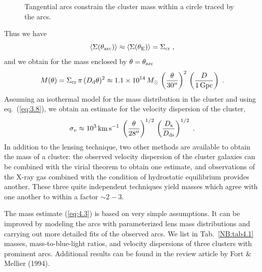 \documentclass[a4paper,10pt]{article} %
\begin{document}
\begin{figure}[ht] %
\begin{center}
\begin{minipage}[t]{0.6\hsize}
\end{minipage}
\end{center}
\caption{Tangential arcs constrain the cluster mass within a circle
  traced by the arcs.}
\label{NB:fig4.2}
\end{figure}

Thus we have
\begin{equation}
  \langle\Sigma(\theta_{\rm arc})\rangle \approx
  \langle\Sigma(\theta_{\rm E})\rangle =
\Sigma_{\rm cr}\;,
\label{eq:4.2}
\end{equation}
and we obtain for the mass enclosed by $\theta=\theta_{\rm arc}$
\begin{equation}
  M(\theta) = \Sigma_{\rm cr}\,\pi\,(D_{\rm d}\theta)^2 \approx
  1.1\times10^{14}\,M_\odot\,\left(\frac{\theta}{30''}\right)^2\,
  \left(\frac{D}{1\,{\rm Gpc}}\right)\;.
\label{eq:4.3}
\end{equation}
Assuming an isothermal model for the mass distribution in the cluster
and using eq.\ (\ref{eq:3.8}), we obtain an estimate for the velocity
dispersion of the cluster,
\begin{equation}
  \sigma_v \approx 10^3\,{\rm km\,s}^{-1}\;
  \left(\frac{\theta}{28''}\right)^{1/2}\,
  \left(\frac{D_{\rm s}}{D_{\rm ds}}\right)^{1/2}\;.
\label{eq:4.4}
\end{equation}
In addition to the lensing technique, two other methods are available
to obtain the mass of a cluster: the observed velocity dispersion of
the cluster galaxies can be combined with the virial theorem to obtain
one estimate, and observations of the X-ray gas combined with the
condition of hydrostatic equilibrium provides another. These three
quite independent techniques yield masses which agree with one another
to within a factor $\sim2-3$.

The mass estimate (\ref{eq:4.3}) is based on very simple assumptions.
It can be improved by modeling the arcs with parameterized lens mass
distributions and carrying out more detailed fits of the observed
arcs. We list in Tab.\ \ref{NB:tab4.1} masses, mass-to-blue-light
ratios, and velocity dispersions of three clusters with prominent
arcs. Additional results can be found in the review article by Fort \&
Mellier (1994).
\end{document}
